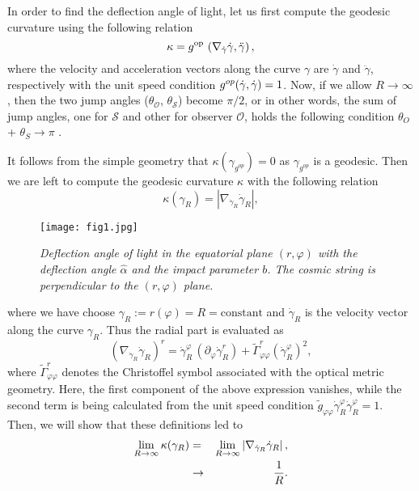 \documentclass[preprint,superscriptaddress,amsfonts,amssymb,amsmath,showpacs]{revtex4}
\begin{document}
In order to find the deflection angle of light, let us first compute the geodesic curvature using the following relation
\begin{equation}
\kappa =g^{\text{op}}\,\left(\nabla _{\dot{%
\gamma}}\dot{\gamma},\ddot{\gamma}\right) ,
\end{equation}
where the velocity and acceleration vectors along the curve $\gamma$ are $\dot{\gamma}$ and $\ddot{\gamma}$, respectively with the unit speed condition $g^{op}(\dot{\gamma},\dot{%
\gamma}) = 1$. Now, if we  allow $R\rightarrow \infty $, then the two jump angles ($\theta _{\mathcal{O}}$, $\theta _{\mathcal{S}}$) become $\pi /2$, or in other words, the sum of jump angles, one for  $\mathcal{S}$ and other for  observer $\mathcal{O}$, holds the following condition $\theta _{\mathit{O}}$ + $ \theta _{\mathit{S}}\rightarrow \pi$ \cite{gibbons1}. 

It follows from the simple geometry that $\kappa (\gamma _{g^{op}})=0$  as $\gamma _{g^{op}}$ is a geodesic. Then we are left to compute the geodesic curvature $\kappa$ with the following relation
\begin{equation}
\kappa (\gamma_{R})=|\nabla _{\dot{\gamma}_{R}}\dot{\gamma}_{R}|,
\end{equation}

\begin{figure}[h!] 
\center
\texttt{[image: fig1.jpg]} 
\caption{\small \textit{Deflection angle of light in the equatorial plane $(r,\varphi)$ with the deflection angle $\hat{\alpha}$ and the impact parameter $b$. The cosmic string is perpendicular to the $(r,\varphi)$ plane.}}
\label{f1}
\end{figure}
 where we have choose $\gamma_{R}:=r(\varphi)=R=\text{constant}$ and $\dot{\gamma}_{R}$ is the velocity vector along the curve ${\gamma}_{R}$. Thus the radial part is evaluated as
\begin{equation}
\left( \nabla _{\dot{\gamma}_{R}}\dot{\gamma}_{R}\right) ^{r}=\dot{\gamma}_{R}^{\varphi
}\,\left( \partial _{\varphi }\dot{\gamma}_{R}^{r}\right) +\tilde{\Gamma} _{\varphi
\varphi }^{r}\left( \dot{\gamma}_{R}^{\varphi }\right) ^{2}, \label{12}
\end{equation}
where  $\tilde{\Gamma}_{\varphi\varphi }^{r}$ denotes the Christoffel symbol associated with the optical metric geometry. Here, the first component of the above expression vanishes, while the second term is being calculated from the unit speed condition $\tilde{g}_{\varphi \varphi}\dot{\gamma}_{R}^{\varphi } \dot{\gamma}_{R}^{\varphi }=1$. Then, we will show that these definitions led to 
\begin{eqnarray}\notag\label{gcurvature}
\lim_{R\rightarrow \infty }\kappa (\gamma_{R}) &=&\lim_{R\rightarrow \infty
}\left\vert \nabla _{\dot{\gamma}_{R}}\dot{\gamma}_{R}\right\vert , \notag \\
&\rightarrow &\frac{1}{R}. 
\end{eqnarray}%
\end{document}

